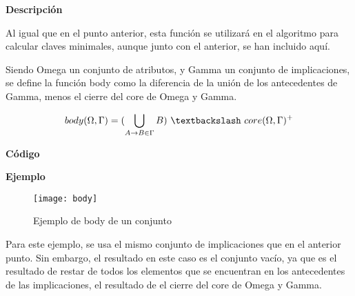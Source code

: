    \textbf{Descripci\'on}

    Al igual que en el punto anterior, esta funci\'on se utilizar\'a en el algoritmo para calcular claves minimales, aunque junto con 
    el anterior, se han incluido aqu\'i.

    Siendo Omega un conjunto de atributos, y Gamma un conjunto de implicaciones, se define la funci\'on body como la diferencia 
    de la uni\'on de los antecedentes de Gamma, menos el cierre del core de Omega y Gamma. 

    \[
        body(\Omega , \Gamma ) = ( \bigcup_{A \to B \in \Gamma} B ) ~ \textbackslash ~ core(\Omega , \Gamma )^+
    \]

    \textbf{C\'odigo}

    
    \clearpage

    \textbf{Ejemplo}


    \begin{figure}[H]
        \centering
        \texttt{[image: body]}
        \caption{Ejemplo de body de un conjunto}
        \label{fig:body}
    \end{figure}

    Para este ejemplo, se usa el mismo conjunto de implicaciones que en el anterior punto. Sin embargo, el resultado en este caso es 
    el conjunto vac\'io, ya que es el resultado de restar de todos los elementos que se encuentran en los antecedentes de las implicaciones, 
    el resultado de el cierre del core de Omega y Gamma.

    